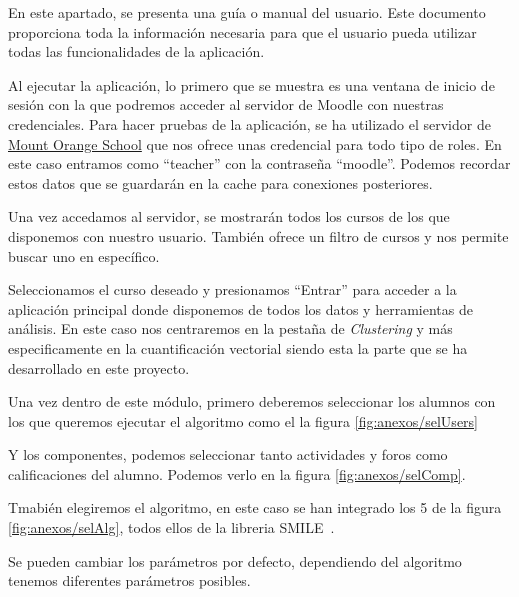 En este apartado, se presenta una guía o manual del usuario. Este documento proporciona toda la información necesaria para que el usuario pueda utilizar todas las funcionalidades de la aplicación.

Al ejecutar la aplicación, lo primero que se muestra es una ventana de inicio de sesión con la que podremos acceder al servidor de Moodle con nuestras credenciales. Para hacer pruebas de la aplicación, se ha utilizado el servidor de \href{https://school.moodledemo.net/}{Mount Orange School} que nos ofrece unas credencial para todo tipo de roles. En este caso entramos como ``teacher'' con la contraseña ``moodle''. Podemos recordar estos datos que se guardarán en la cache para conexiones posteriores.


Una vez accedamos al servidor, se mostrarán todos los cursos de los que disponemos con nuestro usuario. También ofrece un filtro de cursos y nos permite buscar uno en específico. 


Seleccionamos el curso deseado y presionamos ``Entrar'' para acceder a la aplicación principal donde disponemos de todos los datos y herramientas de análisis. En este caso nos centraremos en la pestaña de \emph{Clustering} y más especificamente en la cuantificación vectorial siendo esta la parte que se ha desarrollado en este proyecto.


Una vez dentro de este módulo, primero deberemos seleccionar los alumnos con los que queremos ejecutar el algoritmo como el la figura \ref{fig:anexos/selUsers}


Y los componentes, podemos seleccionar tanto actividades y foros como calificaciones del alumno. Podemos verlo en la figura \ref{fig:anexos/selComp}.


Tmabién elegiremos el algoritmo, en este caso se han integrado los 5 de la figura \ref{fig:anexos/selAlg}, todos ellos de la libreria SMILE~\cite{haifengl:VectorQuantization}.


Se pueden cambiar los parámetros por defecto, dependiendo del algoritmo tenemos diferentes parámetros posibles.

